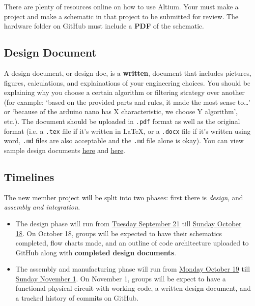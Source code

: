 \documentclass{article}
\begin{document}
    There are plenty of resources online on how to use Altium. Your must make a project and make a schematic in that project to be submitted for review. The hardware folder on GitHub must include a \textbf{PDF} of the schematic.

    
    
    \subsection*{Design Document}
    A design document, or design doc, is a \textbf{written}, document that includes pictures, figures, calculations, and explainations of your engineering choices. You should be explaining why you choose a certain algorithm or filtering strategy over another (for example: `based on the provided parts and rules, it made the most sense to\dots' or `because of the arduino nano has X characteristic, we choose Y algorithm', etc.). The document should be uploaded in \texttt{.pdf} format as well as the original format (i.e. a \texttt{.tex} file if it's written in \LaTeX, or a \texttt{.docx} file if it's written using word, \texttt{.md} files are also acceptable and the \texttt{.md} file alone is okay). You can view sample design documents \href{https://github.com/rutgers-fsae/documentation/blob/main/precharge/main.pdf}{\underline{here}} and \href{https://drive.google.com/file/d/1mUIWuwT8qSY-9I3jNhvqWs8yV2dQfkyD/view?usp=sharing}{\underline{here}}.
    
    \subsection*{Timelines}
    The new member project will be split into two phases: first there is \textit{design}, and \textit{assembly and integration}. 
    \begin{itemize}
        \item The design phase will run from \underline{Tuesday September 21} till \underline{Sunday October 18}. On October 18, groups will be expected to have their schematics completed, flow charts made, and an outline of code architecture uploaded to GitHub along with \textbf{completed design documents}. 
        \item The assembly and manufacturing phase will run from \underline{Monday October 19} till \underline{Sunday November 1}. On November 1, groups will be expect to have a functional physical circuit with working code, a written design document, and a tracked history of commits on GitHub. 
    \end{itemize}
\end{document}
